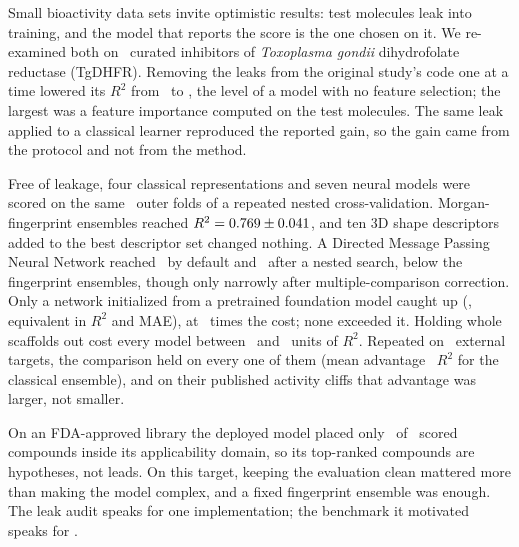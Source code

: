 Small bioactivity data sets invite optimistic results: test molecules leak into training, and the model that
	reports the score is the one chosen on it. We re-examined both on \NCompounds\ curated inhibitors of
	\textit{Toxoplasma gondii} dihydrofolate reductase (TgDHFR). Removing the leaks from the original study's code
	one at a time lowered its $R^2$ from \KarLadderRungZeroRTwoMean\ to \KarLadderRungFourRTwoMean, the level of a
	model with no feature selection; the largest was a feature importance computed on the test molecules. The same
	leak applied to a classical learner reproduced the reported gain, so the gain came from the protocol and not
	from the method.

	Free of leakage, four classical representations and seven neural models were scored on the same
	\TotalOuterFolds\ outer folds of a repeated nested cross-validation. Morgan-fingerprint ensembles reached $R^2 =
	0.769 \pm 0.041$, and ten 3D shape descriptors added to the best descriptor set changed
	nothing. A Directed Message Passing Neural Network reached \ChemPropDMPNNFoldRTwoMean\ by default and
	\GnnTunedRTwoMean\ after a nested search, below the fingerprint ensembles, though only narrowly after
	multiple-comparison correction. Only a network initialized from a pretrained foundation model caught up
	(\ChemeleonRTwoMean, equivalent in $R^2$ and MAE), at \ChemeleonCostFactor\ times the cost; none exceeded it. Holding whole
	scaffolds out cost every model between \ScaffoldDropMin\ and \ScaffoldDropMax\ units of $R^2$. Repeated on
	\GenNTargets\ external targets, the comparison held on every one of them (mean advantage \GenCvAdvMean\ $R^2$ for
	the classical ensemble), and on their published activity cliffs that advantage was larger, not smaller.

	On an FDA-approved library the deployed model placed only \ScreenNDomain\ of \ScreenNStructural\ scored
	compounds inside its applicability domain, so its top-ranked compounds are hypotheses, not leads. On this
	target, keeping the evaluation clean mattered more than making the model complex, and a fixed fingerprint
	ensemble was enough. The leak audit speaks for one implementation; the benchmark it motivated speaks for
	\GenNTargets.
